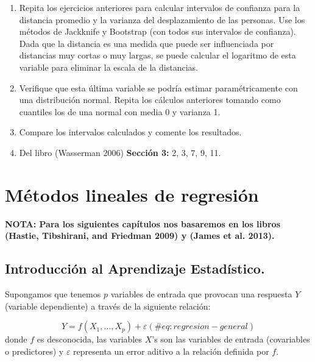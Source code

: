 \documentclass[
  12pt,
]{book}
\begin{document}
\begin{enumerate}
\def\labelenumi{\arabic{enumi}.}
\item
  Repita los ejercicios anteriores para calcular intervalos de confianza
  para la distancia promedio y la varianza del desplazamiento de las
  personas. Use los métodos de Jackknife y Bootstrap (con todos sus
  intervalos de confianza). Dada que la distancia es una medida que
  puede ser influenciada por distancias muy cortas o muy largas, se
  puede calcular el logaritmo de esta variable para eliminar la escala
  de la distancias.
\item
  Verifique que esta última variable se podría estimar paramétricamente
  con una distribución normal. Repita los cálculos anteriores tomando
  como cuantiles los de una normal con media 0 y varianza 1.
\item
  Compare los intervalos calculados y comente los resultados.
\item
  Del libro (Wasserman 2006) \textbf{Sección 3:} 2, 3, 7, 9, 11.
\end{enumerate}

\hypertarget{muxe9todos-lineales-de-regresiuxf3n}{%
\chapter{Métodos lineales de
regresión}\label{muxe9todos-lineales-de-regresiuxf3n}}

\textbf{NOTA: Para los siguientes capítulos nos basaremos en los libros
(Hastie, Tibshirani, and Friedman 2009) y (James et al. 2013).}

\hypertarget{introducciuxf3n-al-aprendizaje-estaduxedstico.}{%
\section{Introducción al Aprendizaje
Estadístico.}\label{introducciuxf3n-al-aprendizaje-estaduxedstico.}}

Supongamos que tenemos \(p\) variables de entrada que provocan una
respuesta \(Y\) (variable dependiente) a través de la siguiente
relación:

\begin{equation}
Y = f(X_{1},\ldots,X_{p}) + \varepsilon
(\#eq:regresion-general)
\end{equation} donde \(f\) es desconocida, las variables \(X\)'s son las
variables de entrada (covariables o predictores) y \(\varepsilon\)
representa un error aditivo a la relación definida por \(f\).
\end{document}
